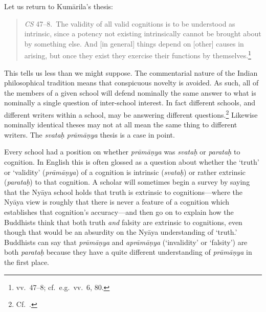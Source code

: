 \documentclass[11pt,letterpaper,oneside]{amsart}
\newcommand{\e}{\emph}
\newenvironment{squote}{\begin{quote}\sf\small}{\rm\end{quote}} %
\begin{document}
Let us return to Kum\=arila's thesis: \begin{squote}\e{CS} 47--8.\ The validity of all valid cognitions is to be understood as intrinsic, since a potency not existing intrinsically cannot be brought about by something else. And [in general] things depend on [other] causes in arising, but once they exist they exercise their functions by themselves.\footnote{vv.\ 47--8; cf.\ e.g.\ vv.\ 6, 80.}\end{squote} This tells us less than we might suppose. The commentarial nature of the Indian philosophical tradition means that conspicuous novelty is avoided. As such, all of the members of a given school will defend nominally the same answer to what is nominally a single question of inter-school interest. In fact different schools, and different writers within a school, may be answering different questions.\footnote{Cf.\ \citet[p.\ 1]{mohanty1989gangesa}.} Likewise nominally identical theses may not at all mean the same thing to different writers. The \emph{svata\d h pr\=am\=a\d nya} thesis is a case in point.










Every school had a position on whether \emph{pr\=am\=a\d nya} was \emph{svata\d h} or \emph{parata\d h} to cognition. In English this is often glossed as a question about whether the `truth' or `validity' (\emph{pr\=am\=a\d nya}) of a cognition is intrinsic (\emph{svata\d h}) or rather extrinsic (\emph{parata\d h}) to that cognition. A scholar will sometimes begin a survey by saying that the Ny\=aya school holds that truth is extrinsic to cognitions---where the Ny\=aya view is roughly that there is never a feature of a cognition which establishes that cognition's accuracy---and then go on to explain how the Buddhists think that both truth \emph{and} falsity are extrinsic to cognitions, even though that would be an absurdity on the Ny\=aya understanding of `truth.' Buddhists can say that \emph{pr\=am\=a\d nya} and \emph{apr\=am\=a\d nya} (`invalidity' or `falsity') are both \emph{parata\d h} because they have a quite different understanding of \emph{pr\=am\=a\d nya} in the first place.
\end{document}
